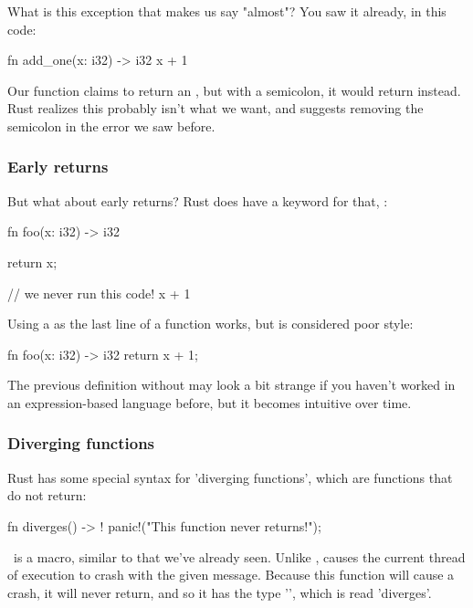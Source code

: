 \blank

What is this exception that makes us say "almost"? You saw it already, in this code:

\begin{rustc}
fn add_one(x: i32) -> i32 {
    x + 1
}
\end{rustc}

Our function claims to return an \itt, but with a semicolon, it would return \code{()} instead. Rust realizes this 
probably isn't what we want, and suggests removing the semicolon in the error we saw before.

\subsubsection*{Early returns}

But what about early returns? Rust does have a keyword for that, :

\begin{rustc}
fn foo(x: i32) -> i32 {
    return x;

    // we never run this code!
    x + 1
}
\end{rustc}

Using a  as the last line of a function works, but is considered poor style:

\begin{rustc}
fn foo(x: i32) -> i32 {
    return x + 1;
}
\end{rustc}

The previous definition without  may look a bit strange if you haven't worked in an expression-based language 
before, but it becomes intuitive over time.

\subsubsection*{Diverging functions}

Rust has some special syntax for 'diverging functions', which are functions that do not return:

\begin{rustc}
fn diverges() -> ! {
    panic!("This function never returns!");
}
\end{rustc}

\panic\ is a macro, similar to  that we've already seen. Unlike ,  causes 
the current thread of execution to crash with the given message. Because this function will cause a crash, it will never return, 
and so it has the type '\code{!}', which is read 'diverges'.


